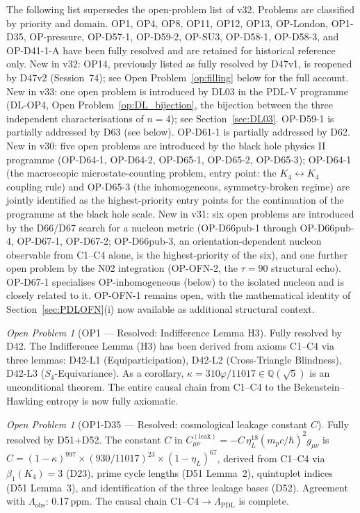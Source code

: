 \documentclass[11pt,a4paper]{article}
\theoremstyle{plain}
\theoremstyle{definition}
\theoremstyle{remark}
\newtheorem{openproblem}[theorem]{Open Problem}
\begin{document}
The following list supersedes the open-problem list of v32. Problems are classified by priority and domain. OP1, OP4, OP8, OP11, OP12, OP13, OP-London, OP1-D35, OP-pressure, OP-D57-1, OP-D59-2, OP-SU3, OP-D58-1, OP-D58-3, and OP-D41-1-A have been fully resolved and are retained for historical reference only. \textcolor{negativered}{New in v32: OP14, previously listed as fully resolved by D47v1, is reopened by D47v2 (Session~74); see Open Problem~\ref{op:filling} below for the full account.} New in v33: one open problem is introduced by DL03 in the PDL-V programme (DL-OP4, Open Problem~\ref{op:DL_bijection}, the bijection between the three independent characterisations of $n=4$); see Section~\ref{sec:DL03}. OP-D59-1 is partially addressed by D63 (see below). OP-D61-1 is partially addressed by D62. New in v30: five open problems are introduced by the black hole physics II programme (OP-D64-1, OP-D64-2, OP-D65-1, OP-D65-2, OP-D65-3); OP-D64-1 (the macroscopic microstate-counting problem, entry point: the $K_4\leftrightarrow K_4$ coupling rule) and OP-D65-3 (the inhomogeneous, symmetry-broken regime) are jointly identified as the highest-priority entry points for the continuation of the programme at the black hole scale. New in v31: six open problems are introduced by the D66/D67 search for a nucleon metric (OP-D66pub-1 through OP-D66pub-4, OP-D67-1, OP-D67-2; OP-D66pub-3, an orientation-dependent nucleon observable from C1--C4 alone, is the highest-priority of the six), and one further open problem by the N02 integration (OP-OFN-2, the $\tau=90$ structural echo). OP-D67-1 specialises OP-inhomogeneous (below) to the isolated nucleon and is closely related to it. OP-OFN-1 remains open, with the mathematical identity of Section~\ref{sec:PDLOFN}(i) now available as additional structural context.

\begin{openproblem}[OP1 --- Resolved: Indifference Lemma H3]
\label{op:H3}
\textcolor{proofblue}{Fully resolved by D42.} The Indifference Lemma (H3) has been derived from axioms C1--C4 via three lemmas: D42-L1 (Equiparticipation), D42-L2 (Cross-Triangle Blindness), D42-L3 ($S_4$-Equivariance). As a corollary, $\kappa=310\varphi/11017\in\mathbb{Q}(\sqrt{5})$ is an unconditional theorem. The entire causal chain from C1--C4 to the Bekenstein--Hawking entropy is now fully axiomatic.
\end{openproblem}

\begin{openproblem}[OP1-D35 --- Resolved: cosmological leakage constant $C$]
\label{op:leakconstant}
\textcolor{proofblue}{Fully resolved by D51+D52.} The constant $C$ in $C^{(\mathrm{leak})}_{\mu\nu}=-C\,\eta_L^{18}(m_p c/\hbar)^2 g_{\mu\nu}$ is $C=(1-\kappa)^{997}\times(930/11017)^{23}\times(1-\eta_L)^{67}$, derived from C1--C4 via $\beta_1(K_4)=3$ (D23), prime cycle lengths (D51 Lemma~2), quintuplet indices (D51 Lemma~3), and identification of the three leakage bases (D52). Agreement with $\Lambda_{\mathrm{obs}}$: 0.17\,ppm. The causal chain $\mathrm{C1\text{--}C4}\to\Lambda_{\mathrm{PDL}}$ is complete.
\end{openproblem}
\end{document}
